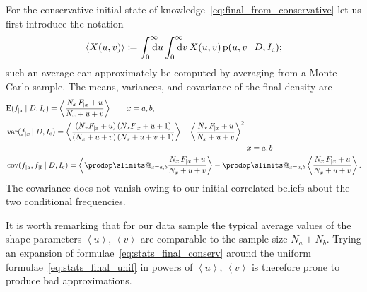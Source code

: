 \documentclass[\ifafour a4paper,12pt,\else a5paper,10pt,\fi%
onecolumn,oneside,article,%
british%
]{memoir}
\makeatletter
\theoremstyle{remark}
\theoremstyle{innote}
\def\prod{\DOTSI\prodop\slimits@}
\newcommand*{\di}{\mathrm{d}}%
\newcommand*{\defd}{\coloneqq}
\newcommand*{\pf}{\mathrm{p}}%
\newcommand*{\E}{\mathrm{E}}
\renewcommand*{\|}[1][]{\nonscript\,#1\vert\nonscript\;\mathopen{}}
\DeclareMathOperator{\cov}{cov}
\DeclareMathOperator{\var}{var}
\newcommand*{\yD}{D}
\newcommand*{\yI}{I}
\newcommand*{\yIu}{\yI_\text{u}}
\newcommand*{\yIc}{\yI_\text{c}}
\newcommand*{\ya}{a}
\newcommand*{\yb}{b}
\newcommand*{\yua}{u}
\newcommand*{\yub}{v}
\newcommand*{\uav}[1]{\left\langle #1 \right\rangle}
\makeatother
\begin{document}
For the conservative initial state of
knowledge~\eqref{eq:final_from_conservative} let us first introduce the
notation
\begin{equation}
  \label{eq:notation_avg_parameters}
  \uav{X(\yua,\yub)} \defd
      \int_{\mathrlap{0}}^{\mathrlap{\infty}}\di\yua
    \int_{\mathrlap{0}}^{\mathrlap{\infty}}\di\yub\,
X(\yua,\yub) \, \pf(\yua,\yub \| \yD,\yIc);
\end{equation}
such an average can approximately be computed by averaging from a Monte
Carlo sample. The means, variances, and covariance of the final density are
\begin{subequations}
  \label{eq:stats_final_conserv}
  \begin{align}
    \label{eq:mean_final_conserv}
    &\E(f_{|x} \| \yD, \yIc) =
                                 \uav{\frac{N_{x}\,F_{|x}+\yua}{N_{x}+\yua+\yub}}
                                 \qquad x=\ya,\yb,
\\
  \label{eq:var_final_conserv}
    &\!\begin{multlined}[\linewidth]
\var(f_{|x} \| \yD, \yIc) =
  \uav{\frac{(N_{x}F_{|x}+\yua)\,(N_{x}F_{|x}+\yua+1)}{(N_{x}+\yua+\yub)\,(N_{x}+\yua+\yub+1)}}
  -
  \uav{\frac{N_{x}\,F_{|x}+\yua}{N_{x}+\yua+\yub}}^2
  \\ x=\ya,\yb  
\end{multlined}
    \\
    \label{eq:cov_final_conserv}
&    \cov(f_{|\ya}, f_{|\yb} \| \yD, \yIc) =
    \uav{\prod_{x=\ya,\yb}\frac{N_{x}\,F_{|x}+\yua}{N_{x}+\yua+\yub}}
    - \prod_{x=\ya,\yb}
    \uav{\frac{N_{x}\,F_{|x}+\yua}{N_{x}+\yua+\yub}}.
  \end{align}
\end{subequations}
The covariance does not vanish owing to our initial correlated beliefs
about the two conditional frequencies.

It is worth remarking that for our data sample the typical average values
of the shape parameters $\uav{\yua}$, $\uav{\yub}$ are comparable to the
sample size $N_{\ya}+N_{\yb}$. Trying an expansion of
formulae~\eqref{eq:stats_final_conserv} around the uniform
formulae~\eqref{eq:stats_final_unif} in powers of $\uav{\yua}$,
$\uav{\yub}$ is therefore prone to produce bad approximations.
\end{document}

